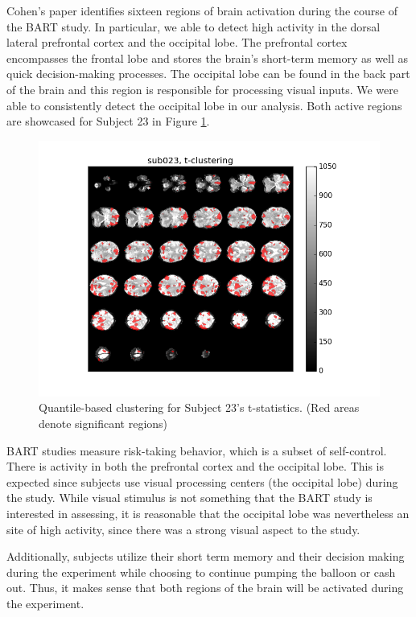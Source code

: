 \par \indent Cohen's paper identifies sixteen regions of brain activation 
during the course of the BART study. In particular, we able to detect 
high activity in the dorsal lateral prefrontal cortex and the occipital lobe. 
The prefrontal cortex encompasses the frontal lobe and stores the brain's 
short-term memory as well as quick decision-making processes. The 
occipital lobe can be found in the back part of the brain and this region
is responsible for processing visual inputs. We were able to consistently 
detect the occipital lobe in our analysis. Both active regions are showcased 
for Subject 23 in Figure \ref{fig:clustersub23}.

\begin{figure}[ht]
\centering
	\includegraphics[width=.8\linewidth]{../images/sub023_t_overlay.png} 
	\caption{Quantile-based clustering for Subject 23's t-statistics. 
	(Red areas denote significant regions)}
	\label{fig:clustersub23}
\end{figure}

\par BART studies measure risk-taking behavior, which is a subset of 
self-control. There is activity in both the prefrontal cortex and the 
occipital lobe. This is expected since subjects use visual processing 
centers (the occipital lobe) during the study. While visual stimulus is not 
something that the BART study is interested in assessing, it is reasonable 
that the occipital lobe was nevertheless an site of high activity, since there 
was a strong visual aspect to the study. 

Additionally, subjects utilize their short term memory and their decision 
making during the experiment while choosing to continue pumping the balloon or 
cash out. Thus, it makes sense that both regions of the brain will be 
activated during the experiment. 

